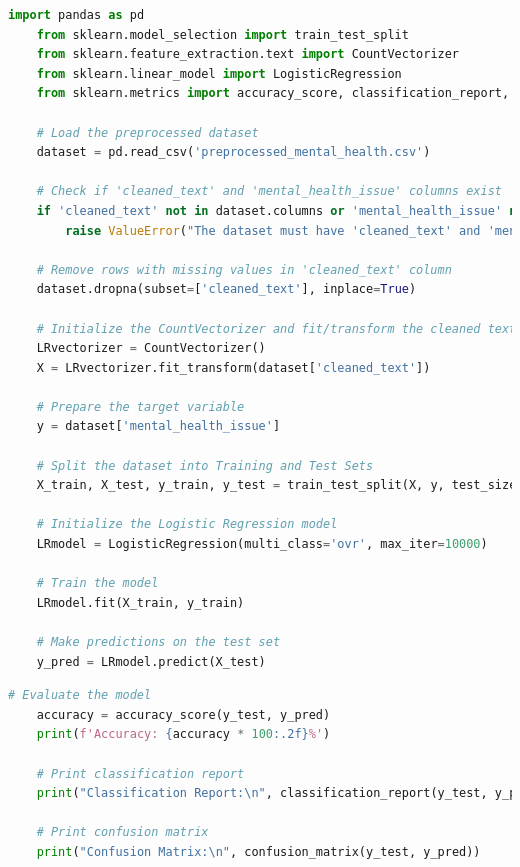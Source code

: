\begin{tcolorbox}[colback=gray!5!white, colframe=gray!80!black, boxrule=0.5pt, title=Logistic Regression for Mental Health Classification]
    \begin{lstlisting}[language=Python]
    import pandas as pd
    from sklearn.model_selection import train_test_split
    from sklearn.feature_extraction.text import CountVectorizer
    from sklearn.linear_model import LogisticRegression
    from sklearn.metrics import accuracy_score, classification_report, confusion_matrix

    # Load the preprocessed dataset
    dataset = pd.read_csv('preprocessed_mental_health.csv')

    # Check if 'cleaned_text' and 'mental_health_issue' columns exist
    if 'cleaned_text' not in dataset.columns or 'mental_health_issue' not in dataset.columns:
        raise ValueError("The dataset must have 'cleaned_text' and 'mental_health_issue' columns.")

    # Remove rows with missing values in 'cleaned_text' column
    dataset.dropna(subset=['cleaned_text'], inplace=True)

    # Initialize the CountVectorizer and fit/transform the cleaned text
    LRvectorizer = CountVectorizer()
    X = LRvectorizer.fit_transform(dataset['cleaned_text'])

    # Prepare the target variable
    y = dataset['mental_health_issue']

    # Split the dataset into Training and Test Sets
    X_train, X_test, y_train, y_test = train_test_split(X, y, test_size=0.2, random_state=42)

    # Initialize the Logistic Regression model
    LRmodel = LogisticRegression(multi_class='ovr', max_iter=10000)

    # Train the model
    LRmodel.fit(X_train, y_train)

    # Make predictions on the test set
    y_pred = LRmodel.predict(X_test)

\end{lstlisting}
\end{tcolorbox}

\begin{tcolorbox}[colback=gray!5!white, colframe=gray!80!black, boxrule=0.5pt, title=Logistic Regression for Mental Health Classification]
    \begin{lstlisting}[language=Python]
    # Evaluate the model
    accuracy = accuracy_score(y_test, y_pred)
    print(f'Accuracy: {accuracy * 100:.2f}%')

    # Print classification report
    print("Classification Report:\n", classification_report(y_test, y_pred))

    # Print confusion matrix
    print("Confusion Matrix:\n", confusion_matrix(y_test, y_pred))
    \end{lstlisting}
\end{tcolorbox}

